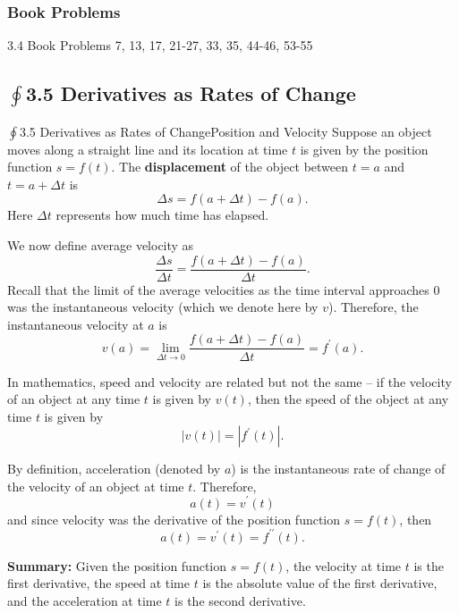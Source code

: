 \documentclass[cal1spr16Lectures.tex]{subfiles}
\begin{document}
\subsubsection{Book Problems}

\begin{frame}
\begin{block}{3.4 Book Problems} 7, 13, 17, 21-27, 33, 35, 44-46, 53-55 \end{block} 
\end{frame}

\subsection[3.5 Derivatives as Rates of Change]{$\textstyle\oint$3.5 Derivatives as Rates of Change}

\begin{frame}{$\oint$3.5 Derivatives as Rates of Change}{\fontsize{11}{12}\selectfont Position and Velocity}
Suppose an object moves along a straight line and its location at time $t$ is given by the position function $s=f(t)$.  The {\bf displacement} of the object between $t=a$ and $t=a+\Delta t$ is 
\[\Delta s = f(a+\Delta t)-f(a).\]
Here $\Delta t$ represents how much time has elapsed.
\end{frame}

\begin{frame}{}
We now define average velocity as 
\[\frac{\Delta s}{\Delta t}=\frac{f(a+\Delta t)-f(a)}{\Delta t}.\]
Recall that the limit of the average velocities as the time interval approaches 0 was the instantaneous velocity (which we denote here by $v$).  Therefore, the instantaneous velocity at $a$ is 
\[v(a)=\lim_{\Delta t \to 0} \frac{f(a+\Delta t)-f(a)}{\Delta t} = f^{\prime}(a).\]
\end{frame}

\begin{frame}{}
In mathematics, speed and velocity are related but not the same -- if the \alert{velocity} of an object at any time $t$ is given by $v(t)$, then the \alert{speed} of the object at any time $t$ is given by 
\[|v(t)|=|f^{\prime}(t)|.\]
\end{frame}

\begin{frame}[allowframebreaks]{}
By definition, acceleration (denoted by $a$) is the instantaneous rate of change of the velocity of an object at time $t$.  Therefore,
\[a(t)=v^{\prime}(t)\]
and since velocity was the derivative of the position function $s=f(t)$, then 
\[a(t)=v^{\prime}(t)=f^{\prime\prime}(t).\]

\framebreak
{\bf Summary:}  Given the position function $s=f(t)$, the velocity at time $t$ is the first derivative, the speed at time $t$ is the absolute value of the first derivative, and the acceleration at time $t$ is the second derivative.
\end{frame}
\end{document}
